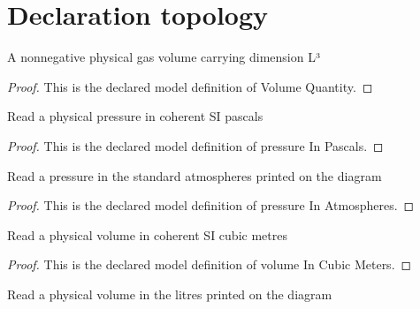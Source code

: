 \section{Declaration topology}
\begin{definition}
  \label{def:physics:phyx-mini-0492:phyxminiproblems-problemphyxmini0492-volumequantity}
  A nonnegative physical gas volume carrying dimension L³
\end{definition}
\begin{proof}
  This is the declared model definition of Volume Quantity.
\end{proof}
\begin{definition}
  \label{def:physics:phyx-mini-0492:phyxminiproblems-problemphyxmini0492-pressureinpascals}
  Read a physical pressure in coherent SI pascals
\end{definition}
\begin{proof}
  This is the declared model definition of pressure In Pascals.
\end{proof}
\begin{definition}
  \label{def:physics:phyx-mini-0492:phyxminiproblems-problemphyxmini0492-pressureinatmospheres}
  Read a pressure in the standard atmospheres printed on the diagram
\end{definition}
\begin{proof}
  This is the declared model definition of pressure In Atmospheres.
\end{proof}
\begin{definition}
  \label{def:physics:phyx-mini-0492:phyxminiproblems-problemphyxmini0492-volumeincubicmeters}
  Read a physical volume in coherent SI cubic metres
\end{definition}
\begin{proof}
  This is the declared model definition of volume In Cubic Meters.
\end{proof}
\begin{definition}
  \label{def:physics:phyx-mini-0492:phyxminiproblems-problemphyxmini0492-volumeinliters}
  Read a physical volume in the litres printed on the diagram
\end{definition}
